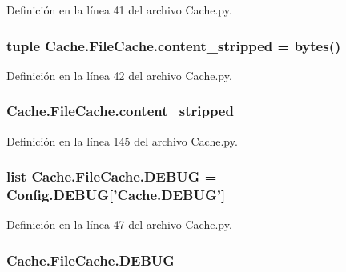 Definición en la línea 41 del archivo Cache.\-py.

\hypertarget{class_cache_1_1_file_cache_a6add3c86ea9523a23c289b660d064e57}{
\subsubsection[{content\-\_\-stripped}]{\setlength{\rightskip}{0pt plus 5cm}tuple Cache.\-File\-Cache.\-content\-\_\-stripped = bytes()\hspace{0.3cm}{\ttfamily [static]}}}\label{class_cache_1_1_file_cache_a6add3c86ea9523a23c289b660d064e57}


Definición en la línea 42 del archivo Cache.\-py.

\hypertarget{class_cache_1_1_file_cache_a6660cc5f8e2408bdece63291305a5e5e}{
\subsubsection[{content\-\_\-stripped}]{\setlength{\rightskip}{0pt plus 5cm}Cache.\-File\-Cache.\-content\-\_\-stripped}}\label{class_cache_1_1_file_cache_a6660cc5f8e2408bdece63291305a5e5e}


Definición en la línea 145 del archivo Cache.\-py.

\hypertarget{class_cache_1_1_file_cache_a263cdec129a60caf90b7c6d5eb5c64f3}{
\subsubsection[{D\-E\-B\-U\-G}]{\setlength{\rightskip}{0pt plus 5cm}list Cache.\-File\-Cache.\-D\-E\-B\-U\-G = Config.\-D\-E\-B\-U\-G\mbox{[}'Cache.\-D\-E\-B\-U\-G'\mbox{]}\hspace{0.3cm}{\ttfamily [static]}}}\label{class_cache_1_1_file_cache_a263cdec129a60caf90b7c6d5eb5c64f3}


Definición en la línea 47 del archivo Cache.\-py.

\hypertarget{class_cache_1_1_file_cache_aca5f594f2c828bbb00e29385b527b5c4}{
\subsubsection[{D\-E\-B\-U\-G}]{\setlength{\rightskip}{0pt plus 5cm}Cache.\-File\-Cache.\-D\-E\-B\-U\-G}}\label{class_cache_1_1_file_cache_aca5f594f2c828bbb00e29385b527b5c4}


